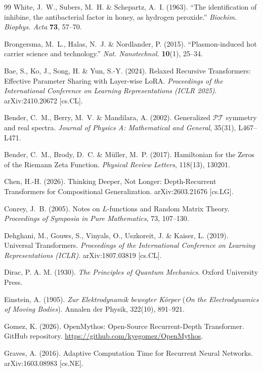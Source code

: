 \begin{thebibliography}{99}
White, J.~W., Subers, M.~H. \& Schepartz, A.~I. (1963).
``The identification of inhibine, the antibacterial factor in honey, as hydrogen peroxide.''
\textit{Biochim. Biophys. Acta} \textbf{73}, 57--70.

Brongersma, M.~L., Halas, N.~J. \& Nordlander, P. (2015).
``Plasmon-induced hot carrier science and technology.''
\textit{Nat. Nanotechnol.} \textbf{10}(1), 25--34.

Bae, S., Ko, J., Song, H. \& Yun, S.-Y. (2024).
Relaxed Recursive Transformers: Effective Parameter Sharing with Layer-wise LoRA.
\textit{Proceedings of the International Conference on Learning Representations (ICLR 2025)}.
arXiv:2410.20672 [cs.CL].

Bender, C.~M., Berry, M.~V. \& Mandilara, A. (2002).
Generalized $\mathcal{PT}$ symmetry and real spectra.
\textit{Journal of Physics A: Mathematical and General}, 35(31), L467--L471.

Bender, C.~M., Brody, D.~C. \& M\"uller, M.~P. (2017).
Hamiltonian for the Zeros of the Riemann Zeta Function.
\textit{Physical Review Letters}, 118(13), 130201.

Chen, H.-H. (2026).
Thinking Deeper, Not Longer: Depth-Recurrent Transformers for Compositional Generalization.
arXiv:2603.21676 [cs.LG].

Conrey, J.~B. (2005).
Notes on $L$-functions and Random Matrix Theory.
\textit{Proceedings of Symposia in Pure Mathematics}, 73, 107--130.

Dehghani, M., Gouws, S., Vinyals, O., Uszkoreit, J. \& Kaiser, L. (2019).
Universal Transformers.
\textit{Proceedings of the International Conference on Learning Representations (ICLR)}.
arXiv:1807.03819 [cs.CL].

Dirac, P. A. M. (1930).
\textit{The Principles of Quantum Mechanics}.
Oxford University Press.

Einstein, A. (1905).
\textit{Zur Elektrodynamik bewegter Körper} (\textit{On the Electrodynamics of Moving Bodies}).
Annalen der Physik, 322(10), 891--921.

Gomez, K. (2026).
OpenMythos: Open-Source Recurrent-Depth Transformer.
GitHub repository. \url{https://github.com/kyegomez/OpenMythos}.

Graves, A. (2016).
Adaptive Computation Time for Recurrent Neural Networks.
arXiv:1603.08983 [cs.NE].


\end{thebibliography}
